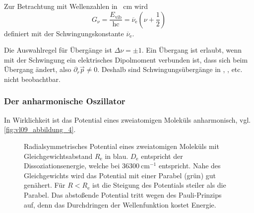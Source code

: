 	\begin{definition}{}
		Zur Betrachtung mit Wellenzahlen in \unit{\per\centi\meter} wird 
		\begin{equation}
			\label{4.32}
			G_{ \nu}= \frac{ E_{\text{vib}}}{\mathrm{h} \mathrm{c}} = \overline{ \nu}_{\mathrm{e}} \left( \nu + \frac{1}{2} \right) 
		\end{equation}
		definiert mit der Schwingungskonstante $\overline\nu_\mathrm e$. 
	\end{definition}


	Die Auswahlregel für Übergänge ist $ \Delta \nu = \pm 1$. Ein Übergang ist erlaubt, wenn mit der Schwingung ein elektrisches Dipolmoment verbunden ist, dass sich beim Übergang ändert, also $ \partial_{r} \Vec{p} \neq 0$. Deshalb sind Schwingungsübergänge in , ,  etc. nicht beobachtbar.

\subsubsection{Der anharmonische Oszillator}
	In Wirklichkeit ist das Potential eines zweiatomigen Moleküls anharmonisch, vgl. \autoref{fig:vl09_abbildung_4}.
	\begin{figure}[H]
		\centering
		\caption{Radialsymmetrisches Potential eines zweiatomigen Moleküls mit Gleichgewichtsabstand $R_\mathrm e$ in blau. $D_{\mathrm{e}}$ entspricht der Dissoziationsenergie, welche bei  $\SI{36300}{\centi \meter ^{-1}}$ entspricht.
			Nahe des Gleichgewichts wird das Potential mit einer Parabel (grün) gut genähert. 
			Für $R<R_\mathrm e$ ist die Steigung des Potentials steiler als die Parabel.
			Das abstoßende Potential tritt wegen des Pauli-Prinzips auf, denn das Durchdringen der Wellenfunktion kostet Energie.
			}
		\label{fig:vl09_abbildung_4}
	\end{figure}

